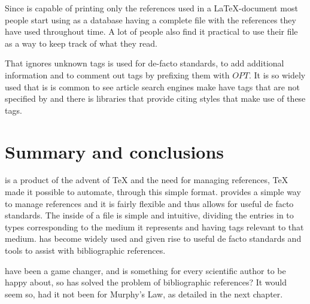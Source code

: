 Since {\bibtex} is capable of printing only the references used in a
{\LaTeX}-document most people start using {\bibtex} as a database
having a complete file with the references they have used throughout
time.  A lot of people also find it practical to use their {\bibtex}
file as a way to keep track of what they read.

That {\bibtex} ignores unknown tags is used for de-facto standards, to
add additional information and to comment out tags by prefixing them
with $OPT$.  It is so widely used that is is common to see article
search engines make have tags that are not specified by {\bibtex} and
there is libraries that provide citing styles that make use of these
tags.


\section{Summary and conclusions}
\label{sec:about_conclusion}

{\bibtex} is a product of the advent of {\TeX} and the
need for managing references, {\TeX} made it possible to automate,
through this simple format.  {\bibtex} provides a simple way to manage
references and it is fairly flexible and thus allows for useful de
facto standards.  The inside of a {\bibtex} file is simple and
intuitive, dividing the entries in to types corresponding to the
medium it represents and having tags relevant to that medium.
{\bibtex} has become widely used and given rise to useful de facto
standards and tools to assist with bibliographic references.

{\bibtex} have been a game changer, and is something for every
scientific author to be happy about, so has {\bibtex} solved the
problem of bibliographic references? It would seem so, had it not been
for Murphy's Law, as detailed in the next chapter.


%
%
